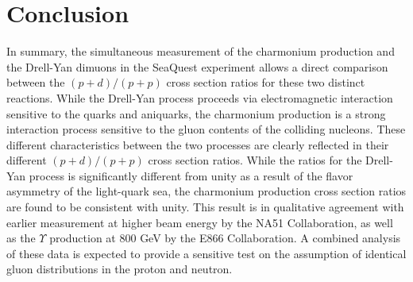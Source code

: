 \documentclass[reprint,aps,unsortedaddress,superscriptaddress,prd,floatfix,showpacs,linenumbers]{revtex4-2}
\begin{document}
\section{Conclusion}
In summary, the simultaneous measurement of the charmonium 
production and the Drell-Yan
dimuons in the SeaQuest experiment allows a direct comparison between 
the $(p+d)/(p+p)$ cross section ratios for these two distinct reactions.
While the Drell-Yan process proceeds via electromagnetic interaction sensitive
to the quarks and aniquarks, the charmonium production is a strong interaction
process sensitive to the gluon contents of the colliding nucleons. These
different characteristics between the two processes are clearly reflected
in their different $(p+d)/(p+p)$ cross section ratios. While the ratios for
the Drell-Yan process is significantly different from unity as a result of
the flavor asymmetry of the light-quark sea, the charmonium production
cross section ratios are found to be consistent with unity. This result
is in qualitative agreement with earlier measurement at higher beam energy
by the NA51 Collaboration, as well as the $\Upsilon$ production at 800 GeV
by the E866 Collaboration. A combined analysis of these data is expected
to provide a sensitive test on the assumption of identical gluon
distributions in the proton and neutron. 


 
\end{document}
